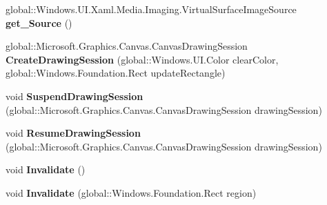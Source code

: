 \begin{DoxyCompactItemize}
\mbox{\label{class_microsoft_1_1_graphics_1_1_canvas_1_1_u_i_1_1_xaml_1_1_canvas_virtual_image_source_a0b38413571f933a578e7b1e5d5956b0d}} 
global\+::\+Windows.\+U\+I.\+Xaml.\+Media.\+Imaging.\+Virtual\+Surface\+Image\+Source {\bfseries get\+\_\+\+Source} ()
\item 
\mbox{\label{class_microsoft_1_1_graphics_1_1_canvas_1_1_u_i_1_1_xaml_1_1_canvas_virtual_image_source_a751435fc921134c60f5373dd117a62da}} 
global\+::\+Microsoft.\+Graphics.\+Canvas.\+Canvas\+Drawing\+Session {\bfseries Create\+Drawing\+Session} (global\+::\+Windows.\+U\+I.\+Color clear\+Color, global\+::\+Windows.\+Foundation.\+Rect update\+Rectangle)
\item 
\mbox{\label{class_microsoft_1_1_graphics_1_1_canvas_1_1_u_i_1_1_xaml_1_1_canvas_virtual_image_source_aeec022e7d81700c461e1f6c2d1d80ecd}} 
void {\bfseries Suspend\+Drawing\+Session} (global\+::\+Microsoft.\+Graphics.\+Canvas.\+Canvas\+Drawing\+Session drawing\+Session)
\item 
\mbox{\label{class_microsoft_1_1_graphics_1_1_canvas_1_1_u_i_1_1_xaml_1_1_canvas_virtual_image_source_a97dd6bba6fd9c0fea9bc567785cb2e43}} 
void {\bfseries Resume\+Drawing\+Session} (global\+::\+Microsoft.\+Graphics.\+Canvas.\+Canvas\+Drawing\+Session drawing\+Session)
\item 
\mbox{\label{class_microsoft_1_1_graphics_1_1_canvas_1_1_u_i_1_1_xaml_1_1_canvas_virtual_image_source_a36a7e3ba8102ce00721b07b902b1f964}} 
void {\bfseries Invalidate} ()
\item 
\mbox{\label{class_microsoft_1_1_graphics_1_1_canvas_1_1_u_i_1_1_xaml_1_1_canvas_virtual_image_source_a9e05f0718686f31ebe81c8b975a09ecd}} 
void {\bfseries Invalidate} (global\+::\+Windows.\+Foundation.\+Rect region)
\item 

\end{DoxyCompactItemize}
